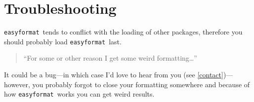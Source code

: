 \documentclass[a4paper, 11pt]{article}
\def\easyformat{\texttt{easyformat}}
\begin{document}
	\section{Troubleshooting}
	\easyformat\ tends to conflict with the loading of other packages, therefore you should probably load \easyformat\ last.
	
	\begin{quotation}
		``For some or other reason I get some weird formatting\dots''
	\end{quotation}

	It could be a bug---in which case I'd love to hear from you (see \ref{contact})---however, you probably forgot to close your formatting somewhere and because of how \easyformat\ works you can get weird results.



	
	
\end{document}
